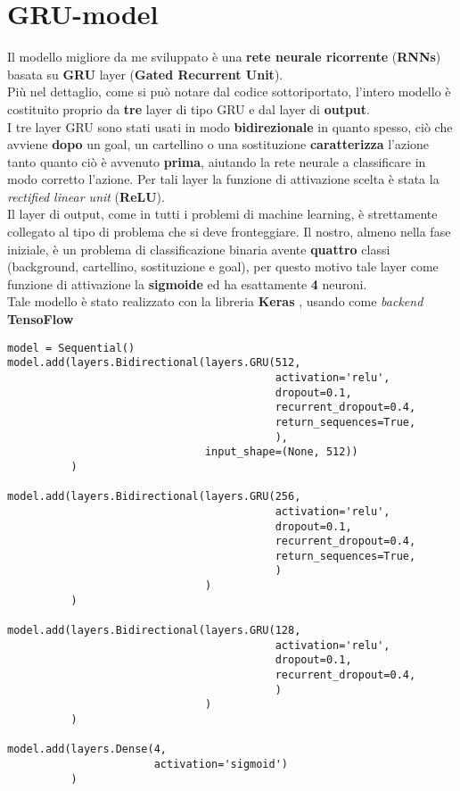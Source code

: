 \section{GRU-model}
\label{section : grumodel}
Il modello migliore da me sviluppato è una \textbf{rete neurale ricorrente} (\textbf{RNNs}) basata su \textbf{GRU} layer (\textbf{Gated Recurrent Unit}). 
\\Più nel dettaglio, come si può notare dal codice sottoriportato, l'intero modello è costituito proprio da \textbf{tre} layer di tipo GRU e dal layer di \textbf{output}.
\\I tre layer GRU sono stati usati in modo \textbf{bidirezionale} in quanto spesso, ciò che avviene \textbf{dopo} un goal, un cartellino o una sostituzione \textbf{caratterizza} l'azione tanto quanto ciò è avvenuto \textbf{prima}, aiutando la rete neurale a classificare in modo corretto l'azione. Per tali layer la funzione di attivazione scelta è stata la \textit{rectified linear unit} (\textbf{ReLU}). \cite{DeepLearningPython}
\\Il layer di output, come in tutti i problemi di machine learning, è strettamente collegato al tipo di problema che si deve fronteggiare. Il nostro, almeno nella fase iniziale, è un problema di classificazione binaria avente \textbf{quattro} classi (background, cartellino, sostituzione e goal), per questo motivo tale layer come funzione di attivazione la \textbf{sigmoide} ed ha esattamente \textbf{4} neuroni.
\\Tale modello è stato realizzato con la libreria \textbf{Keras} \cite{chollet2015keras}, usando come \textit{backend} \textbf{TensoFlow} \cite{tensorflow2015-whitepaper}
\begin{verbatim}
model = Sequential()
model.add(layers.Bidirectional(layers.GRU(512,
                                          activation='relu',
                                          dropout=0.1,
                                          recurrent_dropout=0.4,
                                          return_sequences=True,
                                          ),
                               input_shape=(None, 512))
          )

model.add(layers.Bidirectional(layers.GRU(256,
                                          activation='relu',
                                          dropout=0.1,
                                          recurrent_dropout=0.4,
                                          return_sequences=True,
                                          )
                               )
          )

model.add(layers.Bidirectional(layers.GRU(128,
                                          activation='relu',
                                          dropout=0.1,
                                          recurrent_dropout=0.4,
                                          )
                               )
          )

model.add(layers.Dense(4,
                       activation='sigmoid')
          )
\end{verbatim}
